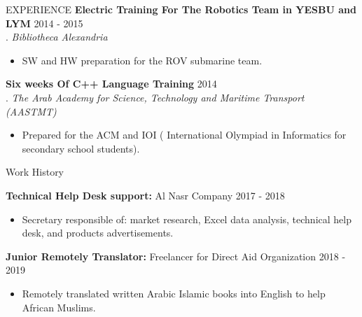 \documentclass{resume} %
\begin{document}
\begin{rSection}{EXPERIENCE}
     \textbf{Electric Training For The Robotics Team in YESBU and LYM} \hfill   2014 - 2015\\
. \hfill \textit{Bibliotheca Alexandria}
  \begin{itemize}
     \itemsep -3pt {} 
      \item  SW and HW preparation for the ROV submarine team.
 \end{itemize}

     \textbf{Six weeks Of C++ Language Training} \hfill   2014\\
. \hfill \textit{The Arab Academy for Science, Technology and Maritime Transport (AASTMT) }
  \begin{itemize}
     \itemsep -3pt {} 
      \item  Prepared for the ACM and IOI ( International Olympiad in Informatics for secondary school students).
 \end{itemize}
 
 \end{rSection} 

\begin{rSection}{Work History}
\vspace{-1.25em}
\item \textbf{Technical Help Desk support:} {Al Nasr Company} \hfill 2017 - 2018
  \begin{itemize}
     \itemsep -3pt {} 
      \item  Secretary responsible of: market research, Excel data analysis, technical help desk, and products advertisements.
 \end{itemize}

\item \textbf{Junior Remotely Translator:} {Freelancer for Direct Aid Organization} \hfill  2018 - 2019
  \begin{itemize}
     \itemsep -3pt {} 
      \item  Remotely translated written Arabic Islamic books into English to help African Muslims.
 \end{itemize}
 
\end{rSection} 

\end{document}
